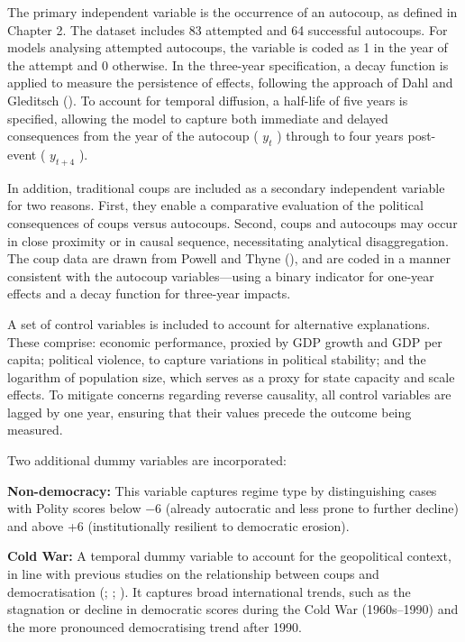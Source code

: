 \documentclass[
  12pt,
]{report}
\begin{document}
The primary independent variable is the occurrence of an autocoup, as
defined in Chapter 2. The dataset includes 83 attempted and 64
successful autocoups. For models analysing attempted autocoups, the
variable is coded as 1 in the year of the attempt and 0 otherwise. In
the three-year specification, a decay function is applied to measure the
persistence of effects, following the approach of Dahl and Gleditsch
(). To account for temporal diffusion, a
half-life of five years is specified, allowing the model to capture both
immediate and delayed consequences from the year of the autocoup (
\(y_t\) ) through to four years post-event ( \(y_{t+4}\) ).

In addition, traditional coups are included as a secondary independent
variable for two reasons. First, they enable a comparative evaluation of
the political consequences of coups versus autocoups. Second, coups and
autocoups may occur in close proximity or in causal sequence,
necessitating analytical disaggregation. The coup data are drawn from
Powell and Thyne (), and are coded in a
manner consistent with the autocoup variables---using a binary indicator
for one-year effects and a decay function for three-year impacts.

A set of control variables is included to account for alternative
explanations. These comprise: economic performance, proxied by GDP
growth and GDP per capita; political violence, to capture variations in
political stability; and the logarithm of population size, which serves
as a proxy for state capacity and scale effects. To mitigate concerns
regarding reverse causality, all control variables are lagged by one
year, ensuring that their values precede the outcome being measured.

Two additional dummy variables are incorporated:

\textbf{Non-democracy:} This variable captures regime type by
distinguishing cases with Polity scores below −6 (already autocratic and
less prone to further decline) and above +6 (institutionally resilient
to democratic erosion).

\textbf{Cold War:} A temporal dummy variable to account for the
geopolitical context, in line with previous studies on the relationship
between coups and democratisation (; ; ). It captures
broad international trends, such as the stagnation or decline in
democratic scores during the Cold War (1960s--1990) and the more
pronounced democratising trend after 1990.
\end{document}

